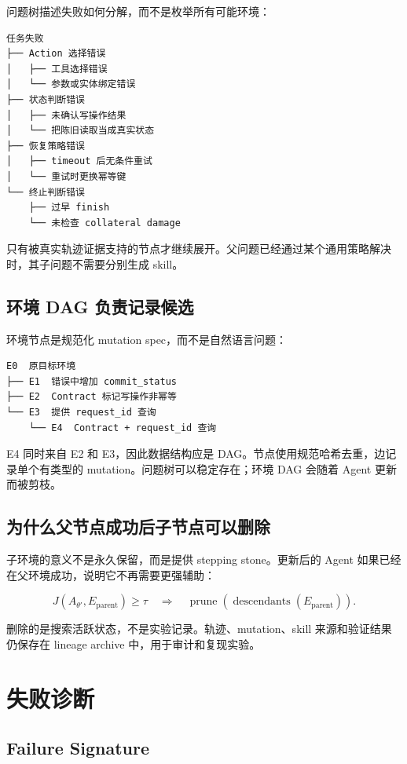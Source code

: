 \documentclass[11pt,a4paper,fontset=fandol]{ctexart}
\newcommand{\Agentnew}{A_{\theta'}}
\begin{document}
问题树描述失败如何分解，而不是枚举所有可能环境：

\begin{verbatim}
任务失败
├── Action 选择错误
│   ├── 工具选择错误
│   └── 参数或实体绑定错误
├── 状态判断错误
│   ├── 未确认写操作结果
│   └── 把陈旧读取当成真实状态
├── 恢复策略错误
│   ├── timeout 后无条件重试
│   └── 重试时更换幂等键
└── 终止判断错误
    ├── 过早 finish
    └── 未检查 collateral damage
\end{verbatim}

只有被真实轨迹证据支持的节点才继续展开。父问题已经通过某个通用策略解决时，其子问题不需要分别生成 skill。

\subsection{环境 DAG 负责记录候选}

环境节点是规范化 mutation spec，而不是自然语言问题：

\begin{verbatim}
E0  原目标环境
├── E1  错误中增加 commit_status
├── E2  Contract 标记写操作非幂等
└── E3  提供 request_id 查询
    └── E4  Contract + request_id 查询
\end{verbatim}

E4 同时来自 E2 和 E3，因此数据结构应是 DAG。节点使用规范哈希去重，边记录单个有类型的 mutation。问题树可以稳定存在；环境 DAG 会随着 Agent 更新而被剪枝。

\subsection{为什么父节点成功后子节点可以删除}

子环境的意义不是永久保留，而是提供 stepping stone。更新后的 Agent 如果已经在父环境成功，说明它不再需要更强辅助：

\begin{equation}
J(\Agentnew,E_{\mathrm{parent}})\ge \tau
\quad\Longrightarrow\quad
\operatorname{prune}(\operatorname{descendants}(E_{\mathrm{parent}})).
\end{equation}

删除的是搜索活跃状态，不是实验记录。轨迹、mutation、skill 来源和验证结果仍保存在 lineage archive 中，用于审计和复现实验。

\section{失败诊断}

\subsection{Failure Signature}
\end{document}
